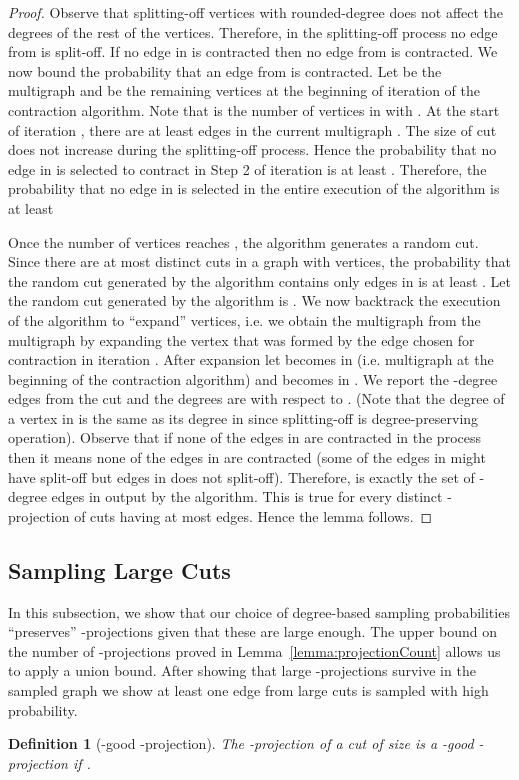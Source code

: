 \documentclass[11pt]{article}
\newtheorem{definition}[theorem]{Definition}
\begin{document}
\begin{proof}
  Observe that splitting-off vertices with rounded-degree  does not affect the degrees of the rest of the vertices. 
  Therefore, in the splitting-off process no edge from  is split-off. 
  If no edge in  is contracted then no edge from  is contracted.
  We now bound the probability that an edge from  is contracted. 
  Let  be the multigraph and  be the remaining vertices at the beginning of iteration  of the contraction algorithm. 
Note that  is the number of vertices in  with . 
  At the start of iteration , there are at least  edges in the current multigraph .
  The size of cut  does not increase during the splitting-off process. 
  Hence the probability that no edge in  is selected to contract in Step 2 of iteration  is at least . 
  Therefore, the probability that no edge in  is selected in the entire execution of the algorithm is at least
  
  Once the number of vertices reaches , the algorithm generates a random cut. 
  Since there are at most  distinct cuts in a graph with  vertices, the probability that the random cut generated by the algorithm contains only edges in  is at least 
  . 
  Let the random cut generated by the algorithm is . 
  We now backtrack the execution of the algorithm to ``expand'' vertices, i.e. we obtain the multigraph  from the multigraph  by expanding the vertex that was formed by the edge chosen for contraction in iteration . 
  After expansion let  becomes  in  (i.e. multigraph at the beginning of the contraction algorithm) and  becomes  in . 
  We report the -degree edges from the cut  and the degrees are with respect to . 
  (Note that the degree of a vertex in  is the same as its degree in  since splitting-off is degree-preserving operation). 
  Observe that if none of the edges in  are contracted in the process then it means none of the edges in  are contracted (some of the edges in  might have split-off but edges in  does not split-off). 
  Therefore,  is exactly the set of -degree edges in  output by the algorithm. 
  This is true for every distinct -projection of cuts having at most  edges. 
  Hence the lemma follows. 
\end{proof}

\subsection{Sampling Large Cuts}
In this subsection, we show that our choice of degree-based sampling probabilities ``preserves''  -projections given that these are large enough. 
The upper bound on the number of -projections proved in Lemma~\ref{lemma:projectionCount} allows us to apply a union bound.
After showing that large -projections survive in the sampled graph we show at least one edge from large cuts is sampled with high probability.
\begin{definition}[-good -projection]
  The -projection  of a cut  of size  is a -good -projection if .
\end{definition}
\end{document}
